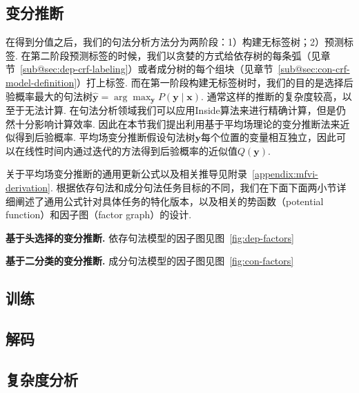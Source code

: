 \subsection{变分推断}

在得到分值之后，我们的句法分析方法分为两阶段：1）构建无标签树；2）预测标签.
在第二阶段预测标签的时候，我们以贪婪的方式给依存树的每条弧（见章节~\ref{sub@sec:dep-crf-labeling}）或者成分树的每个组块（见章节~\ref{sub@sec:con-crf-model-definition}）打上标签.
而在第一阶段构建无标签树时，我们的目的是选择后验概率最大的句法树$\hat{\boldsymbol{y}} = \arg\max_{\boldsymbol{y}} P(\boldsymbol{y}\mid \boldsymbol{x})$.
通常这样的推断的复杂度较高，以至于无法计算.
在句法分析领域我们可以应用Inside算法来进行精确计算，但是仍然十分影响计算效率.
因此在本节我们提出利用基于平均场理论的变分推断法来近似得到后验概率.
平均场变分推断假设句法树$\boldsymbol{y}$每个位置的变量相互独立，因此可以在线性时间内通过迭代的方法得到后验概率的近似值$Q(\boldsymbol{y})$.

关于平均场变分推断的通用更新公式以及相关推导见附录~\ref{appendix:mfvi-derivation}.
根据依存句法和成分句法任务目标的不同，我们在下面下面两小节详细阐述了通用公式针对具体任务的特化版本，以及相关的势函数（potential function）和因子图（factor graph）的设计.

\noindent\textbf{基于头选择的变分推断.}
依存句法模型的因子图见图~\ref{fig:dep-factors}

\noindent\textbf{基于二分类的变分推断.}
成分句法模型的因子图见图~\ref{fig:con-factors}

\subsection{训练}

\subsection{解码}

\subsection{复杂度分析}


